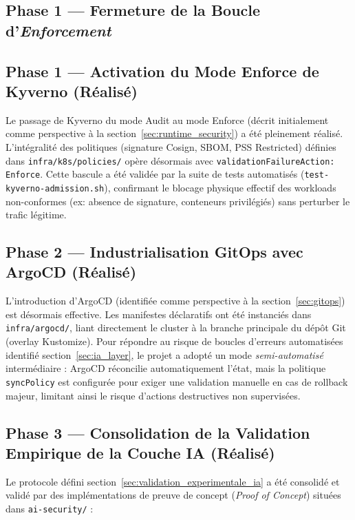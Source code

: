 \subsection{Phase 1 — Fermeture de la Boucle d'\textit{Enforcement}}

\subsection{Phase 1 — Activation du Mode Enforce de Kyverno (Réalisé)}

Le passage de Kyverno du mode Audit au mode Enforce (décrit initialement comme perspective à la section~\ref{sec:runtime_security}) a été pleinement réalisé. L'intégralité des politiques (signature Cosign, SBOM, PSS Restricted) définies dans \texttt{infra/k8s/policies/} opère désormais avec \texttt{validationFailureAction: Enforce}. Cette bascule a été validée par la suite de tests automatisés (\texttt{test-kyverno-admission.sh}), confirmant le blocage physique effectif des workloads non-conformes (ex: absence de signature, conteneurs privilégiés) sans perturber le trafic légitime.

\subsection{Phase 2 — Industrialisation GitOps avec ArgoCD (Réalisé)}

L'introduction d'ArgoCD (identifiée comme perspective à la section~\ref{sec:gitops}) est désormais effective. Les manifestes déclaratifs ont été instanciés dans \texttt{infra/argocd/}, liant directement le cluster à la branche principale du dépôt Git (overlay Kustomize). Pour répondre au risque de boucles d'erreurs automatisées identifié section~\ref{sec:ia_layer}, le projet a adopté un mode \textit{semi-automatisé} intermédiaire : ArgoCD réconcilie automatiquement l'état, mais la politique \texttt{syncPolicy} est configurée pour exiger une validation manuelle en cas de rollback majeur, limitant ainsi le risque d'actions destructives non supervisées.

\subsection{Phase 3 — Consolidation de la Validation Empirique de la Couche IA (Réalisé)}

Le protocole défini section~\ref{sec:validation_experimentale_ia} a été consolidé et validé par des implémentations de preuve de concept (\textit{Proof of Concept}) situées dans \texttt{ai-security/} :

